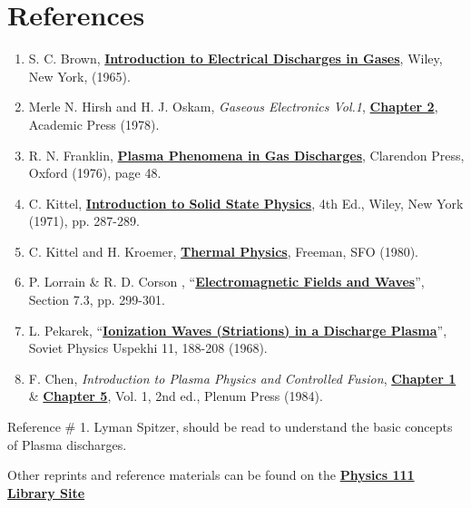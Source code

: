 \documentclass{../lab}
\begin{document}
\section{References}
\label{sec:References}

\begin{enumerate}
    \item S. C. Brown, \href{http://experimentationlab.berkeley.edu/sites/default/files/Electrical-Discharges-In-Gases.pdf}{\textbf{Introduction to Electrical Discharges in Gases}}, Wiley, New York, (1965).
    
    \item Merle N. Hirsh and H. J. Oskam, \emph{Gaseous Electronics Vol.1}, \href{http://physics111.lib.berkeley.edu/Physics111/Reprints/HAL/Gaseous\%20Electronics_HirshnOskam\%20ch2.pdf}{\textbf{Chapter 2}}, Academic Press (1978).
    

    \item R. N. Franklin, \href{http://physics111.lib.berkeley.edu/Physics111/Reprints/HAL/01-Plasma\_Phenomena\_in\_Gas\_Discharges.pdf}{\textbf{Plasma Phenomena in Gas Discharges}}, Clarendon Press, Oxford (1976), page 48.

    \item C. Kittel, \href{http://physics111.lib.berkeley.edu/Physics111/Reprints/HAL/02-Intro\_to\_Solid\_State\_Physics.pdf}{\textbf{Introduction to Solid State Physics}}, 4th Ed., Wiley, New York (1971), pp. 287-289.

    \item C. Kittel and H. Kroemer, \href{http://experimentationlab.berkeley.edu/sites/default/files/KKThermodynamics.pdf}{\textbf{Thermal Physics}}, Freeman, SFO (1980).

    \item P. Lorrain \& R. D. Corson , ``\href{http://physics111.lib.berkeley.edu/Physics111/Reprints/HAL/03-Electromagnetic\_Field\_and\_Waves.pdf}{\textbf{Electromagnetic Fields and Waves}}'', Section 7.3, pp. 299-301.

    \item L. Pekarek, ``\href{http://physics111.lib.berkeley.edu/Physics111/Reprints/HAL/05-Ionization_Waves.pdf}{\textbf{Ionization Waves (Striations) in a Discharge Plasma}}'', Soviet Physics Uspekhi 11, 188-208 (1968).

    \item F. Chen, \emph{Introduction to Plasma Physics and Controlled Fusion}, \href{http://physics111.lib.berkeley.edu/Physics111/Reprints/HAL/06-Intro\_to\_Plasma\_Physics\_CH1.pdf}{\textbf{Chapter 1}} \& \href{http://physics111.lib.berkeley.edu/Physics111/Reprints/HAL/06-Intro\_to\_Plasma\_Physics\_CH5.pdf}{\textbf{Chapter 5}}, Vol. 1, 2nd ed., Plenum Press (1984).

\end{enumerate}

\noindent Reference \# 1. Lyman Spitzer, should be read to understand the basic concepts of Plasma discharges.

\noindent Other reprints and reference materials can be found on the \href{http://physics111.lib.berkeley.edu/Physics111/Reprints/HAL/HAL\_index.html}{\textbf{Physics 111 Library Site}}
\end{document}
